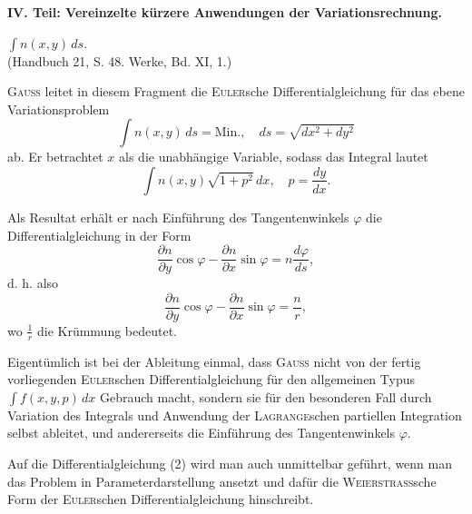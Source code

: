\clearpage\begingroup\NoSourceHead{}
\renewcommand{\thefootnote}{\arabic{footnote})}\setcounter{footnote}{0}
\begin{center}\bfseries IV. Teil: Vereinzelte kürzere Anwendungen der Variationsrechnung.\end{center}
\begin{center} $\int n(x,y)\,ds$.\\
\small (Handbuch 21, S. 48. Werke, Bd. XI, 1.)\end{center}
\noindent\hspace*{\parindent}\textsc{Gauss} leitet in diesem Fragment die \textsc{Euler}sche Differentialgleichung für
das ebene Variationsproblem
\[
\int n(x,y)\,ds=\mathrm{Min.},\quad ds=\sqrt{dx^2+dy^2}
\]
ab. Er betrachtet $x$ als die unabhängige Variable, sodass das Integral lautet
\[
\int n(x,y)\sqrt{1+p^2}\,dx,\quad p=\frac{dy}{dx}.
\]
\par\noindent\hspace*{\parindent}Als Resultat erhält er nach Einführung des Tangentenwinkels $\varphi$ die
Differentialgleichung in der Form
\begin{equation*}\tag{1}
\frac{\partial n}{\partial y}\cos\varphi-\frac{\partial n}{\partial x}\sin\varphi=n\frac{d\varphi}{ds},
\end{equation*}
d. h. also
\begin{equation*}\tag{2}
\frac{\partial n}{\partial y}\cos\varphi-\frac{\partial n}{\partial x}\sin\varphi=\frac{n}{r},
\end{equation*}
wo $\frac1r$ die Krümmung bedeutet.
\par\noindent\hspace*{\parindent}Eigentümlich ist bei der Ableitung einmal, dass \textsc{Gauss} nicht von der
fertig vorliegenden \textsc{Euler}schen Differentialgleichung für den allgemeinen Typus
\clearpage{}
\noindent $\int f(x,y,p)\,dx$ Gebrauch macht, sondern sie für den besonderen Fall durch
Variation des Integrals und Anwendung der \textsc{Lagrange}schen partiellen Integration selbst ableitet, und andererseits die Einführung des Tangentenwinkels $\varphi$.
\par\noindent\hspace*{\parindent}Auf die Differentialgleichung (2) wird man auch unmittelbar geführt,
wenn man das Problem in Parameterdarstellung ansetzt und dafür die \textsc{Weierstrass}sche Form der \textsc{Euler}schen Differentialgleichung hinschreibt.
